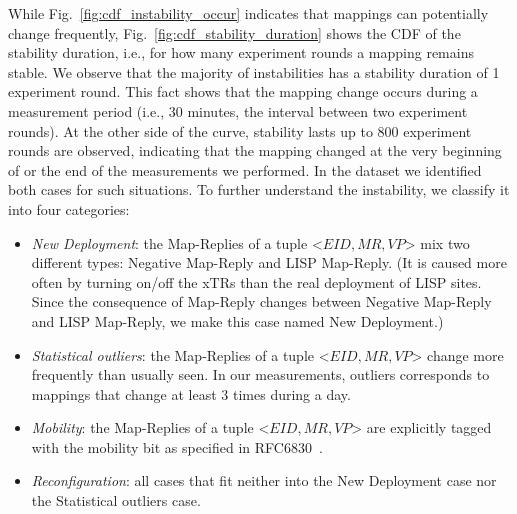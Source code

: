 While Fig.~\ref{fig:cdf_instability_occur} indicates that mappings can potentially change frequently, Fig.~\ref{fig:cdf_stability_duration} shows the CDF of the stability duration, i.e., for how many experiment rounds a mapping remains stable. We observe that the majority of instabilities has a stability duration of 1 experiment round. This fact shows that the mapping change occurs during a measurement period (i.e., 30 minutes, the interval between two experiment rounds). At the other side of the curve, stability lasts up to 800 experiment rounds are observed, indicating that the mapping changed at the very beginning of or the end of the measurements we performed. In the dataset we identified both cases for such situations. To further understand the instability, we classify it into four categories:
\begin{itemize}
  \item \emph{New Deployment}: the Map-Replies of a tuple <$EID, MR, VP$> mix two different types: Negative Map-Reply and LISP Map-Reply. (It is caused more often by turning on/off the xTRs than the real deployment of LISP sites. Since the consequence of Map-Reply changes between Negative Map-Reply and LISP Map-Reply, we make this case named New Deployment.)
  \item \emph{Statistical outliers}: the Map-Replies of a tuple <$EID, MR, VP$> change more frequently than usually seen. In our measurements, outliers corresponds to mappings that change at least 3 times during a day.    
  \item \emph{Mobility}: the Map-Replies of a tuple <$EID, MR, VP$> are explicitly tagged with the mobility bit as specified in RFC6830~\cite{rfc6830}.  
  \item \emph{Reconfiguration}: all cases that fit neither into the New Deployment case nor the Statistical outliers case.
\end{itemize}

\begin{table}[!tb]
	\centering
	\caption{Percentage of Instabilities by Category}
	\label{tab:Proporition_instability}{
	}
\end{table}

